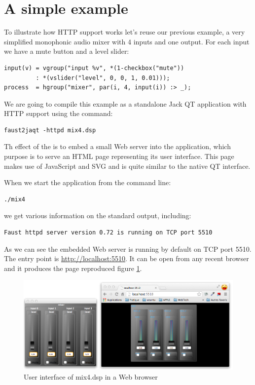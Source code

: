 \section{A simple example}

To illustrate how HTTP support works let's reuse our previous  example, a very simplified monophonic audio mixer with 4 inputs and one output. For each input we have a mute button and a level slider:
\begin{lstlisting}
input(v) = vgroup("input %v", *(1-checkbox("mute")) 
         : *(vslider("level", 0, 0, 1, 0.01)));
process  = hgroup("mixer", par(i, 4, input(i)) :> _);
\end{lstlisting}

We are going to compile this example as a standalone Jack QT application with HTTP support using the command:
\begin{lstlisting}
faust2jaqt -httpd mix4.dsp
\end{lstlisting}
Th effect of the  is to embed a small Web server into the application, which  purpose is to serve an HTML page representing its user interface. This page makes use of JavaScript and SVG and is quite similar to the native QT interface.

When we start the application from the command line:
\begin{lstlisting}
./mix4 
\end{lstlisting}
we get various information on the standard output, including:
\begin{lstlisting}
Faust httpd server version 0.72 is running on TCP port 5510
\end{lstlisting}

As we can see the embedded Web server is running by default on TCP port 5510. The entry point is \url{http://localhost:5510}. It can be open from any recent browser and it produces the page reproduced figure \ref{fig:mix4-http}.


\begin{figure}[h!]
  \centering
  \includegraphics[scale=0.275]{images/mix4-http.png}
  \caption{User interface of mix4.dsp in a Web browser}   
  \label{fig:mix4-http}
\end{figure}

